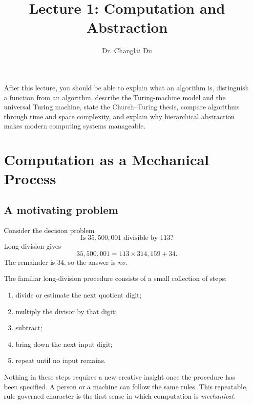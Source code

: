 \documentclass[11pt]{article}
\title{\vspace{-2em}\textbf{Lecture 1: Computation and Abstraction}}
\author{Dr. Changlai Du}
\date{}
\begin{document}
\maketitle

\begin{keyidea}
After this lecture, you should be able to explain what an algorithm is, distinguish a function from an algorithm, describe the Turing-machine model and the universal Turing machine, state the Church--Turing thesis, compare algorithms through time and space complexity, and explain why hierarchical abstraction makes modern computing systems manageable.
\end{keyidea}

\tableofcontents

\section{Computation as a Mechanical Process}

\subsection{A motivating problem}

Consider the decision problem
\[
  \text{Is }35{,}500{,}001\text{ divisible by }113?
\]
Long division gives
\[
  35{,}500{,}001=113\times314{,}159+34.
\]
The remainder is $34$, so the answer is \emph{no}.

The familiar long-division procedure consists of a small collection of steps:
\begin{enumerate}
  \item divide or estimate the next quotient digit;
  \item multiply the divisor by that digit;
  \item subtract;
  \item bring down the next input digit;
  \item repeat until no input remains.
\end{enumerate}
Nothing in these steps requires a new creative insight once the procedure has been specified. A person or a machine can follow the same rules. This repeatable, rule-governed character is the first sense in which computation is \emph{mechanical}.
\end{document}
